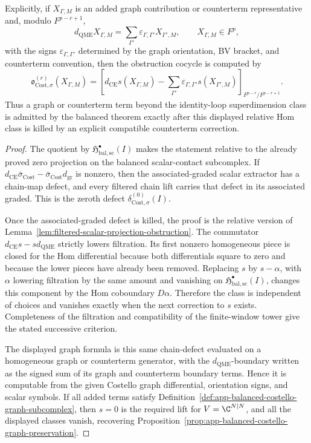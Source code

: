 \begin{thm}
  Explicitly, if \(X_{\Gamma,M}\) is an added graph contribution or
  counterterm representative and, modulo \(F^{p-r+1}\),
  \[
    d_{\mathrm{QME}}X_{\Gamma,M}
      =
    \sum_{\Gamma'}\varepsilon_{\Gamma,\Gamma'}X_{\Gamma',M},
    \qquad
    X_{\Gamma,M}\in F^p,
  \]
  with the signs \(\varepsilon_{\Gamma,\Gamma'}\) determined by the
  graph orientation, BV bracket, and counterterm convention, then the
  obstruction cocycle is computed by
  \[
    \mathfrak o^{(r)}_{\mathrm{Cost},\sigma}(X_{\Gamma,M})
      =
    {\left[
      d_{\mathrm{CE}}s(X_{\Gamma,M})
        -
      \sum_{\Gamma'}\varepsilon_{\Gamma,\Gamma'}s(X_{\Gamma',M})
    \right]}_{F^{p-r}/F^{p-r+1}} .
  \]
  Thus a graph or counterterm term beyond the identity-loop
  superdimension class is admitted by the balanced theorem exactly after
  this displayed relative Hom class is killed by an explicit compatible
  counterterm correction.
\end{thm}

\begin{proof}
  The quotient by
  \(\mathfrak H^\bullet_{\mathrm{bal,sc}}(I)\) makes the statement
  relative to the already proved zero projection on the balanced
  scalar-contact subcomplex.  If
  \(d_{\mathrm{CE}}\bar\sigma_{\mathrm{Cost}}
    -\bar\sigma_{\mathrm{Cost}}d_{\operatorname{gr}}\)
  is nonzero, then the associated-graded scalar extractor has a chain-map
  defect, and every filtered chain lift carries that defect in its
  associated graded.  This is
  the zeroth defect
  \(\delta^{(0)}_{\mathrm{Cost},\sigma}(I)\).

  Once the associated-graded defect is killed, the proof is the relative
  version of Lemma~\ref{lem:filtered-scalar-projection-obstruction}.
  The commutator \(d_{\mathrm{CE}}s-sd_{\mathrm{QME}}\) strictly lowers
  filtration.  Its first nonzero homogeneous piece is closed for the Hom
  differential because both differentials square to zero and because the
  lower pieces have already been removed.  Replacing \(s\) by
  \(s-\alpha\), with \(\alpha\) lowering filtration by the same amount
  and vanishing on
  \(\mathfrak H^\bullet_{\mathrm{bal,sc}}(I)\), changes this component
  by the Hom coboundary \(D\alpha\).  Therefore the class is independent
  of choices and vanishes exactly when the next correction to \(s\)
  exists.  Completeness of the filtration and compatibility of the
  finite-window tower give the stated successive criterion.

  The displayed graph formula is this same chain-defect evaluated on a
  homogeneous graph or counterterm generator, with the
  \(d_{\mathrm{QME}}\)-boundary written as the signed sum of its graph
  and counterterm boundary terms.  Hence it is computable from the
  given Costello graph differential, orientation signs, and scalar
  symbols.  If all added terms satisfy
  Definition~\ref{def:app-balanced-costello-graph-subcomplex}, then
  \(s=0\) is the required lift for \(V=\C^{N|N}\), and all the displayed
  classes vanish, recovering
  Proposition~\ref{prop:app-balanced-costello-graph-preservation}.
\end{proof}

